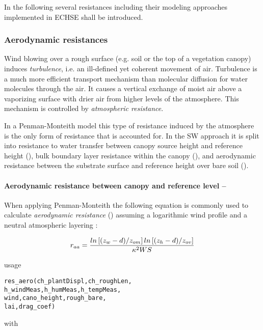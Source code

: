 In the following several resistances including their modeling approaches implemented in ECHSE shall be introduced.


\subsubsection{Aerodynamic resistances}
Wind blowing over a rough surface (e.g. soil or the top of a vegetation canopy) induces \emph{turbulence}, i.e. an ill-defined yet coherent movement of air. Turbulence is a much more efficient transport mechanism than molecular diffusion for water molecules through the air. It causes a vertical exchange of moist air above a vaporizing surface with drier air from higher levels of the atmosphere. This mechanism is controlled by \emph{atmospheric resistance}.

In a Penman-Monteith model this type of resistance induced by the atmosphere is the only form of resistance that is accounted for. In the SW approach it is split into resistance to water transfer between canopy source height and reference height (\resAero{}), bulk boundary layer resistance within the canopy (\resCA{}), and aerodynamic resistance between the substrate surface and reference height over bare soil (\resSA{}).


\paragraph{Aerodynamic resistance between canopy and reference level -- \resAero{}}
When applying Penman-Monteith the following equation is commonly used to calculate \emph{aerodynamic resistance} (\resAero{}) assuming a logarithmic wind profile and a neutral atmospheric layering \citep{Maidment1993,Dyck1995}:

\begin{equation} \label{eqn:et:res:raa}
r_{aa} = \frac{ln \left[ (z_w - d) / z_{om} \right] ln \left[ (z_h - d) / z_{ov} \right]}{\kappa^2 WS}
\end{equation}

\noindent
usage
\begin{verbatim}
res_aero(ch_plantDispl,ch_roughLen,
h_windMeas,h_humMeas,h_tempMeas,
wind,cano_height,rough_bare,
lai,drag_coef)
\end{verbatim}

\noindent
with\\ \vspace*{2ex}

